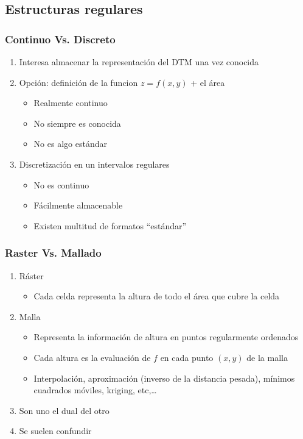 \subsection[Ráster]{Estructuras regulares}
\begin{frame}
  \frametitle{Continuo Vs. Discreto}
  \begin{enumerate}
    \item Interesa almacenar la representación del DTM una vez conocida
    \item Opción: definición de la funcion $z = f(x,y)$ + el área
      \begin{itemize}
        \item[\tickYes] Realmente continuo
        \item[\tickNo] No siempre es conocida
        \item[\tickNo] No es algo estándar
      \end{itemize}
    \item Discretización en un intervalos regulares
      \begin{itemize}
        \item[\tickNo] No es continuo
        \item[\tickYes] Fácilmente almacenable
        \item[\tickYes] Existen multitud de formatos ``estándar''
      \end{itemize}
  \end{enumerate}
\end{frame}
\begin{frame}
  \frametitle{Raster Vs. Mallado}
  \begin{enumerate}
    \item<1-> \alert{Ráster} 
      \begin{itemize}
        \item Cada celda representa la altura de todo el área que cubre la celda
      \end{itemize}
    \item<2-> Malla
      \begin{itemize}
        \item Representa la información de altura en puntos regularmente ordenados
        \item Cada altura es la evaluación de $f$ en cada punto $(x,y)$ de la
          malla
        \item Interpolación, aproximación (inverso de la distancia pesada),
          mínimos cuadrados móviles, kriging, etc,\ldots
      \end{itemize}
        \item<3-> Son uno el dual del otro
    \item<4-> Se suelen confundir
  \end{enumerate}
\end{frame}
